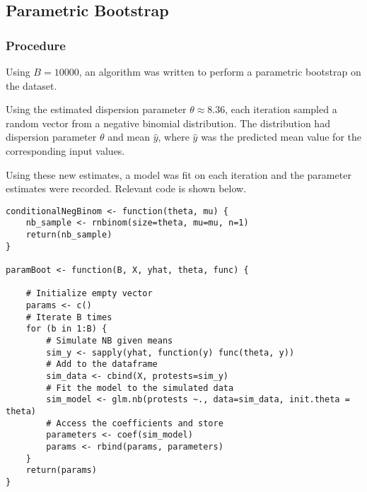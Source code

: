 \documentclass[12pt]{article}
\begin{document}
\subsection{Parametric Bootstrap}
\subsubsection*{Procedure}
Using $B = 10000$, an algorithm was written to perform a parametric bootstrap on the dataset.

Using the estimated dispersion parameter $\theta \approx 8.36$, each iteration sampled a random vector from a negative binomial distribution. The distribution had dispersion parameter $\theta$ and mean $\hat y$, where $\hat y$ was the predicted mean value for the corresponding input values.

Using these new estimates, a model was fit on each iteration and the parameter estimates were recorded. Relevant code is shown below.

\begin{lstlisting}
conditionalNegBinom <- function(theta, mu) {
    nb_sample <- rnbinom(size=theta, mu=mu, n=1)
    return(nb_sample)
}

paramBoot <- function(B, X, yhat, theta, func) {

    # Initialize empty vector
    params <- c()
    # Iterate B times
    for (b in 1:B) {
        # Simulate NB given means
        sim_y <- sapply(yhat, function(y) func(theta, y))
        # Add to the dataframe
        sim_data <- cbind(X, protests=sim_y)
        # Fit the model to the simulated data
        sim_model <- glm.nb(protests ~., data=sim_data, init.theta = theta)
        # Access the coefficients and store
        parameters <- coef(sim_model)
        params <- rbind(params, parameters)
    }
    return(params)
}
\end{lstlisting}
\end{document}
